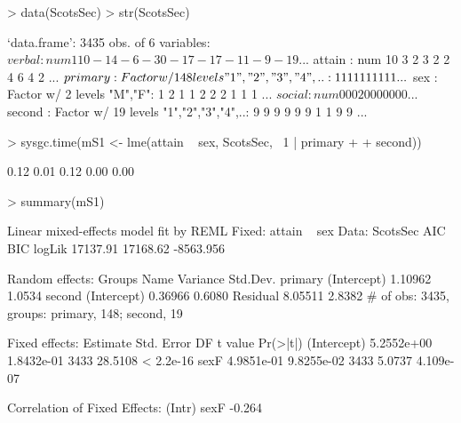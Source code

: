 \documentclass[12pt]{article}
\begin{document}
\begin{Schunk}
\begin{Sinput}
> data(ScotsSec)
> str(ScotsSec)
\end{Sinput}
\begin{Soutput}
`data.frame':	3435 obs. of  6 variables:
 $ verbal : num  11 0 -14 -6 -30 -17 -17 -11 -9 -19 ...
 $ attain : num  10 3 2 3 2 2 4 6 4 2 ...
 $ primary: Factor w/ 148 levels "1","2","3","4",..: 1 1 1 1 1 1 1 1 1 1 ...
 $ sex    : Factor w/ 2 levels "M","F": 1 2 1 1 2 2 2 1 1 1 ...
 $ social : num  0 0 0 20 0 0 0 0 0 0 ...
 $ second : Factor w/ 19 levels "1","2","3","4",..: 9 9 9 9 9 9 1 1 9 9 ...
\end{Soutput}
\begin{Sinput}
> sysgc.time(mS1 <- lme(attain ~ sex, ScotsSec, ~1 | primary + 
+     second))
\end{Sinput}
\begin{Soutput}
[1] 0.12 0.01 0.12 0.00 0.00
\end{Soutput}
\begin{Sinput}
> summary(mS1)
\end{Sinput}
\begin{Soutput}
Linear mixed-effects model fit by REML
Fixed: attain ~ sex 
 Data: ScotsSec 
      AIC      BIC    logLik
 17137.91 17168.62 -8563.956

Random effects:
 Groups   Name        Variance Std.Dev.
 primary  (Intercept) 1.10962  1.0534  
 second   (Intercept) 0.36966  0.6080  
 Residual             8.05511  2.8382  
# of obs: 3435, groups: primary, 148; second, 19

Fixed effects:
              Estimate Std. Error   DF t value  Pr(>|t|)
(Intercept) 5.2552e+00 1.8432e-01 3433 28.5108 < 2.2e-16
sexF        4.9851e-01 9.8255e-02 3433  5.0737 4.109e-07

Correlation of Fixed Effects:
     (Intr)
sexF -0.264
\end{Soutput}
\end{Schunk}
\end{document}
